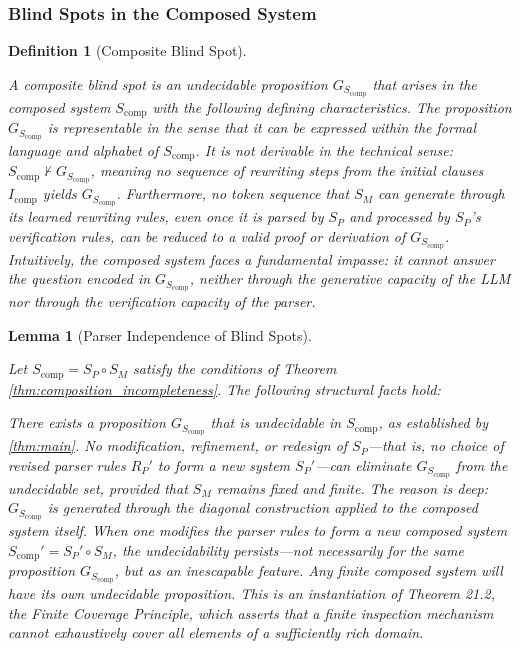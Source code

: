 \documentclass[11pt]{article}
\newtheorem{lemma}[theorem]{Lemma}
\newtheorem{definition}[theorem]{Definition}
\begin{document}
\subsubsection{Blind Spots in the Composed System}

\begin{definition}[Composite Blind Spot]
\label{def:composite_blindspot}

A composite blind spot is an undecidable proposition $G_{S_{\text{comp}}}$ that arises in the composed system $S_{\text{comp}}$ with the following defining characteristics. The proposition $G_{S_{\text{comp}}}$ is representable in the sense that it can be expressed within the formal language and alphabet of $S_{\text{comp}}$. It is not derivable in the technical sense: $S_{\text{comp}} \not\vdash G_{S_{\text{comp}}}$, meaning no sequence of rewriting steps from the initial clauses $I_{\text{comp}}$ yields $G_{S_{\text{comp}}}$. Furthermore, no token sequence that $S_M$ can generate through its learned rewriting rules, even once it is parsed by $S_P$ and processed by $S_P$'s verification rules, can be reduced to a valid proof or derivation of $G_{S_{\text{comp}}}$. Intuitively, the composed system faces a fundamental impasse: it cannot answer the question encoded in $G_{S_{\text{comp}}}$, neither through the generative capacity of the LLM nor through the verification capacity of the parser.

\end{definition}

\begin{lemma}[Parser Independence of Blind Spots]
\label{lem:parser_independence}

Let $S_{\text{comp}} = S_P \circ S_M$ satisfy the conditions of Theorem \ref{thm:composition_incompleteness}. The following structural facts hold:

There exists a proposition $G_{S_{\text{comp}}}$ that is undecidable in $S_{\text{comp}}$, as established by \ref{thm:main}. No modification, refinement, or redesign of $S_P$—that is, no choice of revised parser rules $R_P'$ to form a new system $S_P'$—can eliminate $G_{S_{\text{comp}}}$ from the undecidable set, \textit{provided that $S_M$ remains fixed and finite}. The reason is deep: $G_{S_{\text{comp}}}$ is generated through the diagonal construction applied to the composed system itself. When one modifies the parser rules to form a new composed system $S_{\text{comp}}' = S_P' \circ S_M$, the undecidability persists—not necessarily for the same proposition $G_{S_{\text{comp}}}$, but as an inescapable feature. Any finite composed system will have its own undecidable proposition. This is an instantiation of Theorem 21.2, the Finite Coverage Principle, which asserts that a finite inspection mechanism cannot exhaustively cover all elements of a sufficiently rich domain.

\end{lemma}
\end{document}
